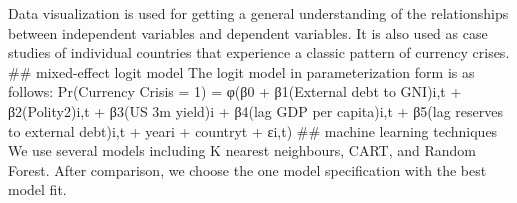\documentclass[12pt,]{article}
\begin{document}
Data visualization is used for getting a general understanding of the
relationships between independent variables and dependent variables. It
is also used as case studies of individual countries that experience a
classic pattern of currency crises. \#\# mixed-effect logit model The
logit model in parameterization form is as follows: Pr(Currency Crisis =
1) = φ(β0 + β1(External debt to GNI)i,t + β2(Polity2)i,t + β3(US 3m
yield)i + β4(lag GDP per capita)i,t + β5(lag reserves to external
debt)i,t + yeari + countryt + εi,t) \#\# machine learning techniques We
use several models including K nearest neighbours, CART, and Random
Forest. After comparison, we choose the one model specification with the
best model fit.
\end{document}
